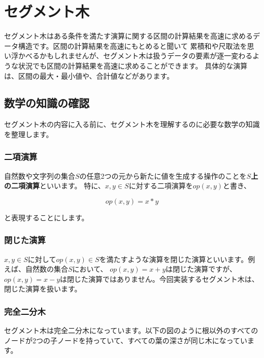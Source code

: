 \newpage

\section{セグメント木}
セグメント木はある条件を満たす演算に関する区間の計算結果を高速に求めるデータ構造です。区間の計算結果を高速にもとめると聞いて
累積和や尺取法を思い浮かべるかもしれませんが、セグメント木は扱うデータの要素が逐一変わるような状況でも区間の計算結果を高速に求めることができます。
具体的な演算は、区間の最大・最小値や、合計値などがあります。

\subsection{数学の知識の確認}
セグメント木の内容に入る前に、セグメント木を理解するのに必要な数学の知識を整理します。

\subsubsection{二項演算}

自然数や文字列の集合$S$の任意2つの元から新たに値を生成する操作のことを\textbf{$S$上の二項演算}といいます。
特に、$x, y \in S$に対する二項演算を$op(x, y)$と書き、

\begin{equation*}
	op(x, y) = x * y
\end{equation*}

と表現することにします。

\subsubsection{閉じた演算}
$x, y \in S$に対して$op(x, y) \in S$を満たすような演算を閉じた演算といいます。例えば、自然数の集合$S$において、
$op(x, y) = x + y$は閉じた演算ですが、$op(x, y) = x - y$は閉じた演算ではありません。今回実装するセグメント木は、閉じた演算を扱います。

\subsubsection{完全二分木}
セグメント木は完全二分木になっています。以下の図のように根以外のすべてのノードが2つの子ノードを持っていて、すべての葉の深さが同じ木になっています。

\vspace{0.25cm}

